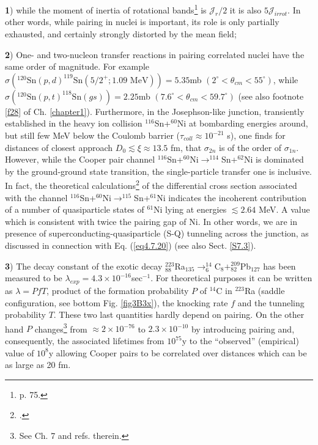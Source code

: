   \textbf{1}) while the moment of inertia of rotational bands\footnote{\cite{Bohr:75} p. 75.} is $\mathcal J_r/2$ it is also $5 \mathcal J_{irrot}$. In other words, while pairing in nuclei is important, its role is only partially exhausted, and certainly strongly distorted by the mean field; 
  
  \textbf{2}) One- and two-nucleon transfer reactions in pairing correlated nuclei have the same order of magnitude. 
   For example $\sigma (^{120}\text{Sn}(p,d)^{119}\text{Sn}(5/2^+; 1.09 \text{ MeV}))=5.35 $mb $(2^\circ<\theta_{cm}<55^\circ)$, while $\sigma (^{120}\text{Sn}(p,t)^{118}\text{Sn}(gs))=2.25 $mb $(7.6^\circ<\theta_{cm}<59.7^\circ)$ (see also footnote \ref{f28} of  Ch. \ref{chapter1}). Furthermore, in the Josephson-like junction, transiently established in the heavy ion collision $^{116}$Sn+$^{60}$Ni at bombarding energies around, but still few MeV below the Coulomb barrier ($\tau_{coll}\approx10^{-21}$ s), one finds for distances of closest approach $D_0\lesssim\xi\approx13.5$ fm, that $\sigma_{2n}$ is of the order of $\sigma_{1n}$. However, while the Cooper pair channel $^{116}$Sn+$^{60}$Ni$\to^{114}$Sn+$^{62}$Ni is dominated by the ground-ground state transition, the single-particle transfer one is inclusive. In fact, the theoretical calculations\footnote{\cite{Montanari:14,Potel:20b}.} of the differential cross section  associated with the channel $^{116}$Sn+$^{60}$Ni$\to^{115}$Sn+$^{61}$Ni indicates the incoherent contribution of a number of quasiparticle states of $^{61}$Ni lying at energies $\lesssim2.64$ MeV. A value which is consistent with twice the pairing gap of Ni. In other words, we are in presence of superconducting-quasiparticle (S-Q) tunneling across the junction, as discussed in connection with Eq. (\ref{eq4.7.20}) (see also Sect. \ref{S7.3}).
  
  
   \textbf{3}) The decay constant of the exotic decay $^{223}_{88}$Ra$_{135}\rightarrow^{14}_6$C$_8+^{209}_{82}$Pb$_{127}$ has been measured to be $\lambda_{exp}=4.3\times10^{-16}$sec$^{-1}$. For theoretical purposes it can be written as $\lambda=PfT$, product of the formation probability $P$ of $^{14}$C in $^{223}$Ra (saddle configuration, see bottom Fig. \ref{fig3B3x}), the knocking rate $f$ and the tunneling probability $T$. These two last quantities hardly depend on pairing. On the other hand $P$ changes\footnote{See \cite{Brink:05} Ch. 7 and refs. therein.} from $\approx 2\times10^{-76}$ to $2.3\times10^{-10}$ by introducing pairing and, consequently, the associated lifetimes from $10^{75}$y to the ``observed'' (empirical) value of $10^8$y  allowing Cooper pairs to be correlated over distances which can be as large as 20 fm.
 
